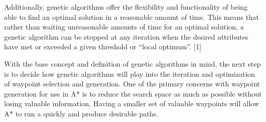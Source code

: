 	Additionally, genetic algorithms offer the flexibility and functionality of being able to find an optimal solution in a reasonable amount of time. This means that rather than waiting unreasonable amounts of time for an optimal solution, a genetic algorithm can be stopped at any iteration when the desired attributes have met or exceeded a given threshold or “local optimum”. [1]
	
	With the base concept and definition of genetic algorithms in mind, the next step is to decide how genetic algorithms will play into the iteration and optimization of waypoint selection and generation. One of the primary concerns with waypoint generation for use in A* is to reduce the search space as much as possible without losing valuable information. Having a smaller set of valuable waypoints will allow A* to run a quickly and produce desirable paths.
	